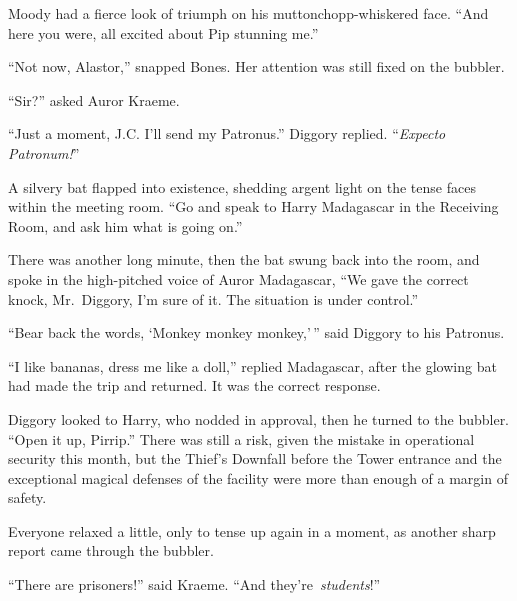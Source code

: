 Moody had a fierce look of triumph on his muttonchopp-whiskered face.
``And here you were, all excited about Pip stunning me.''

``Not now, Alastor,'' snapped Bones. Her attention was still fixed on
the bubbler.

``Sir?'' asked Auror Kraeme.

``Just a moment, J.C. I'll send my Patronus.'' Diggory replied.
``\emph{Expecto Patronum!}''

A silvery bat flapped into existence, shedding argent light on the tense
faces within the meeting room. ``Go and speak to Harry Madagascar in the
Receiving Room, and ask him what is going on.''

There was another long minute, then the bat swung back into the room,
and spoke in the high-pitched voice of Auror Madagascar, ``We gave the
correct knock, Mr.~Diggory, I'm sure of it. The situation is under
control.''

``Bear back the words, `Monkey monkey monkey,'\,'' said Diggory to his
Patronus.

``I like bananas, dress me like a doll,'' replied Madagascar, after the
glowing bat had made the trip and returned. It was the correct response.

Diggory looked to Harry, who nodded in approval, then he turned to the
bubbler. ``Open it up, Pirrip.'' There was still a risk, given the
mistake in operational security this month, but the Thief's Downfall
before the Tower entrance and the exceptional magical defenses of the
facility were more than enough of a margin of safety.

Everyone relaxed a little, only to tense up again in a moment, as
another sharp report came through the bubbler.

``There are prisoners!'' said Kraeme. ``And they're~\emph{students}!''
